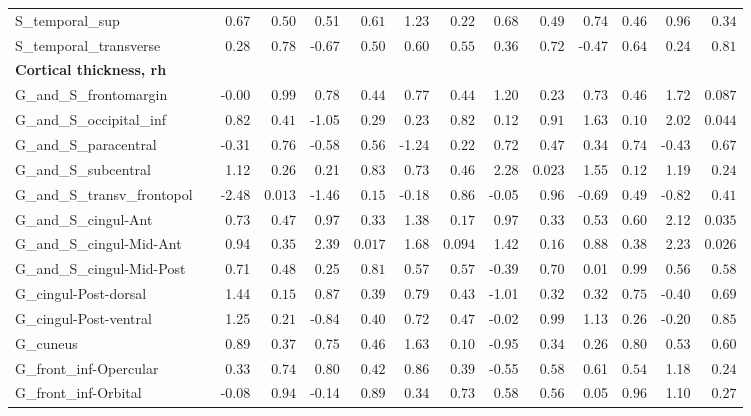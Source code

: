 {\begin{longtable}{llrrrrrrrrrrrr}
S\_temporal\_sup &  & 0.67 & $0.50$ & 0.51 & $0.61$ & 1.23 & $0.22$ & 0.68 & $0.49$ & 0.74 & $0.46$ & 0.96 & $0.34$ \\
S\_temporal\_transverse &  & 0.28 & $0.78$ & -0.67 & $0.50$ & 0.60 & $0.55$ & 0.36 & $0.72$ & -0.47 & $0.64$ & 0.24 & $0.81$ \\
\midrule\multicolumn{14}{l}{\textbf{Cortical thickness, rh}} \\
G\_and\_S\_frontomargin &  & -0.00 & $0.99$ & 0.78 & $0.44$ & 0.77 & $0.44$ & 1.20 & $0.23$ & 0.73 & $0.46$ & 1.72 & $0.087$ \\
G\_and\_S\_occipital\_inf &  & 0.82 & $0.41$ & -1.05 & $0.29$ & 0.23 & $0.82$ & 0.12 & $0.91$ & 1.63 & $0.10$ & 2.02 & $0.044$ \\
G\_and\_S\_paracentral &  & -0.31 & $0.76$ & -0.58 & $0.56$ & -1.24 & $0.22$ & 0.72 & $0.47$ & 0.34 & $0.74$ & -0.43 & $0.67$ \\
G\_and\_S\_subcentral &  & 1.12 & $0.26$ & 0.21 & $0.83$ & 0.73 & $0.46$ & 2.28 & $0.023$ & 1.55 & $0.12$ & 1.19 & $0.24$ \\
G\_and\_S\_transv\_frontopol &  & -2.48 & $0.013$ & -1.46 & $0.15$ & -0.18 & $0.86$ & -0.05 & $0.96$ & -0.69 & $0.49$ & -0.82 & $0.41$ \\
G\_and\_S\_cingul-Ant &  & 0.73 & $0.47$ & 0.97 & $0.33$ & 1.38 & $0.17$ & 0.97 & $0.33$ & 0.53 & $0.60$ & 2.12 & $0.035$ \\
G\_and\_S\_cingul-Mid-Ant &  & 0.94 & $0.35$ & 2.39 & $0.017$ & 1.68 & $0.094$ & 1.42 & $0.16$ & 0.88 & $0.38$ & 2.23 & $0.026$ \\
G\_and\_S\_cingul-Mid-Post &  & 0.71 & $0.48$ & 0.25 & $0.81$ & 0.57 & $0.57$ & -0.39 & $0.70$ & 0.01 & $0.99$ & 0.56 & $0.58$ \\
G\_cingul-Post-dorsal &  & 1.44 & $0.15$ & 0.87 & $0.39$ & 0.79 & $0.43$ & -1.01 & $0.32$ & 0.32 & $0.75$ & -0.40 & $0.69$ \\
G\_cingul-Post-ventral &  & 1.25 & $0.21$ & -0.84 & $0.40$ & 0.72 & $0.47$ & -0.02 & $0.99$ & 1.13 & $0.26$ & -0.20 & $0.85$ \\
G\_cuneus &  & 0.89 & $0.37$ & 0.75 & $0.46$ & 1.63 & $0.10$ & -0.95 & $0.34$ & 0.26 & $0.80$ & 0.53 & $0.60$ \\
G\_front\_inf-Opercular &  & 0.33 & $0.74$ & 0.80 & $0.42$ & 0.86 & $0.39$ & -0.55 & $0.58$ & 0.61 & $0.54$ & 1.18 & $0.24$ \\
G\_front\_inf-Orbital &  & -0.08 & $0.94$ & -0.14 & $0.89$ & 0.34 & $0.73$ & 0.58 & $0.56$ & 0.05 & $0.96$ & 1.10 & $0.27$ \\

\end{longtable}}
